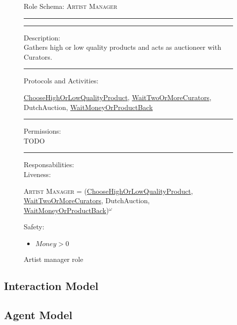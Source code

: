 \documentclass[a4paper,11pt]{report}
\begin{document}
  \begin{figure}[ht!]
    \begin{mdframed}
      Role Schema: \textsc{Artist Manager} \\ \hrule \vspace{2pt} \hrule \vspace{10pt}
      Description:\\
      Gathers high or low quality products and acts as auctioneer with Curators.
      \\ \hrule \vspace{10pt}
      Protocols and Activities:
      \vspace{-10pt}
      \begin{flushleft}
       \underline{ChooseHighOrLowQualityProduct}, \underline{WaitTwoOrMoreCurators}, DutchAuction, \underline{WaitMoneyOrProductBack}
      \end{flushleft}
      \hrule \vspace{10pt}
      Permissions:\\
      TODO %
      \\ \hrule \vspace{10pt}
      Responsabilities:\\
      Liveness:
      \vspace{-10pt}
      \begin{flushleft}
      \small\textsc{Artist Manager} = (\underline{ChooseHighOrLowQualityProduct}, \underline{WaitTwoOrMoreCurators}, DutchAuction, \underline{WaitMoneyOrProductBack})$^\omega$
      \end{flushleft}
      Safety:
      \vspace{-10pt}
      \begin{itemize}
       \item $Money > 0$
      \end{itemize}
    \end{mdframed}
  \caption{Artist manager role}
  \label{figure:role_artist_manager}
  \end{figure}
  
  \subsection{Interaction Model}
  
  \subsection{Agent Model}
  
\end{document}

